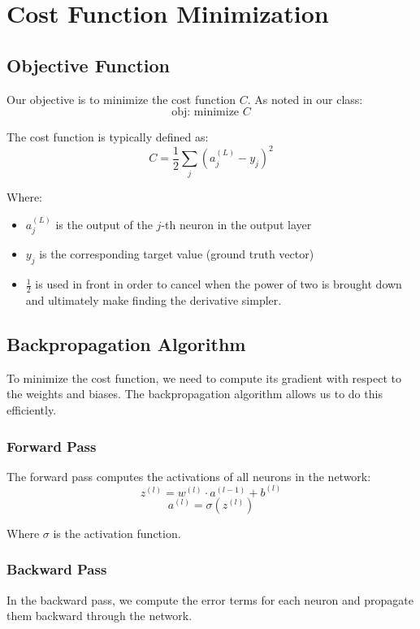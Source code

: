 \section{Cost Function Minimization}

\subsection{Objective Function}
Our objective is to minimize the cost function $C$. As noted in our class:
\begin{equation}
\text{obj: minimize } C
\end{equation}

The cost function is typically defined as:
\begin{equation}
C = \frac{1}{2}\sum_j (a_j^{(L)} - y_j)^2
\end{equation}

Where:
\begin{itemize}
    \item $a_j^{(L)}$ is the output of the $j$-th neuron in the output layer
    \item $y_j$ is the corresponding target value (ground truth vector)
    \item $\frac{1}{2}$ is used in front in order to cancel when the power of two is brought down and ultimately make finding the derivative simpler.
\end{itemize}

\subsection{Backpropagation Algorithm}
To minimize the cost function, we need to compute its gradient with respect to the weights and biases. The backpropagation algorithm allows us to do this efficiently.

\subsubsection{Forward Pass}
The forward pass computes the activations of all neurons in the network:
\begin{equation}
z^{(l)} = w^{(l)} \cdot a^{(l-1)} + b^{(l)}
\end{equation}
\begin{equation}
a^{(l)} = \sigma(z^{(l)})
\end{equation}

Where $\sigma$ is the activation function.

\subsubsection{Backward Pass}
In the backward pass, we compute the error terms for each neuron and propagate them backward through the network.

